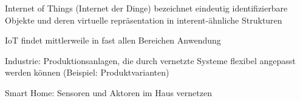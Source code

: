 \begin{notes}
\begin{notes}
    \end{notes}
    \begin{notes}
        \item Internet of Things (Internet der Dinge) bezeichnet eindeutig identifizierbare Objekte und deren virtuelle repräsentation in interent-ähnliche Strukturen\cite{Jie2013} 
        \item IoT findet mittlerweile in fast allen Bereichen Anwendung
        \item Industrie: Produktionsanlagen, die durch vernetzte Systeme flexibel angepasst werden können (Beispiel: Produktvarianten)
        \item Smart Home: Sensoren und Aktoren im Haus vernetzen \cite{Wortmann2015}
    \end{notes}


\end{notes}
